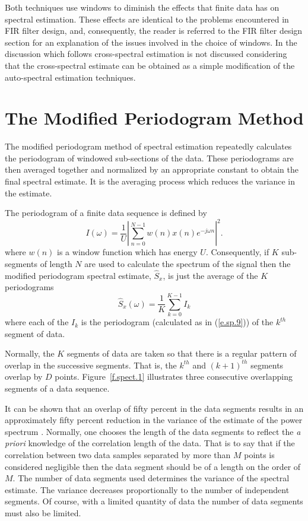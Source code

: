 	Both techniques use windows
to diminish the effects that finite data has on spectral estimation.
These effects are identical to the problems encountered in
FIR filter design, and, consequently, the reader is referred to
the FIR filter design section for an explanation of the
issues involved in the choice of windows.  In the discussion
which follows cross-spectral estimation is not discussed considering
that the cross-spectral estimate can be obtained as a simple
modification of the auto-spectral estimation techniques.

\section{The Modified Periodogram Method}

	The modified periodogram method of spectral estimation
repeatedly calculates the periodogram of windowed sub-sections of the data.
These periodograms are then averaged together and normalized by
an appropriate constant to obtain the final spectral estimate.
It is the averaging process which reduces the variance in the
estimate.

	The periodogram of a finite data sequence is defined by
%
\begin{equation}
I(\omega)=\frac{1}{U}|\sum_{n=0}^{N-1}w(n)x(n)e^{-j\omega n}|^2.
\label{e.sp.9}
\end{equation}
%
where $w(n)$ is a window function which has energy $U$.  Consequently,
if $K$ sub-segments of length $N$ are used to calculate the spectrum
of the signal then the modified periodogram spectral estimate, $\hat{S}_x$,
is just the average of the $K$ periodograms
%
\begin{equation}
\hat{S}_x(\omega)=\frac{1}{K}\sum_{k=0}^{K-1}I_k
\label{e.sp.10}
\end{equation}
%
where each of the $I_k$ is the periodogram (calculated as in (\ref{e.sp.9}))
of the $k^{th}$ segment of data.

	Normally, the $K$ segments of data are taken so that there
is a regular pattern of overlap in the successive segments.  That is,
the $k^{th}$ and $(k+1)^{th}$ segments overlap by $D$ points.
Figure~\ref{f.spect.1} illustrates three consecutive
overlapping segments of a data sequence.
%

%
It can be shown that an overlap of fifty percent in the data segments
results in an approximately fifty percent reduction in the variance
of the estimate of the power spectrum \cite{rabiner}.  Normally, one
chooses the length of the data segments to reflect the {\em a priori}
knowledge of the correlation length of the data.  That is to say
that if the correlation between two data samples separated by more than $M$
points is considered negligible then the data segment should be of
a length on the order of $M$.  The number of data segments used determines
the variance of the spectral estimate.  The variance decreases proportionally
to the number of independent segments.  Of course, with a limited
quantity of data the number of data segments must also be limited.

